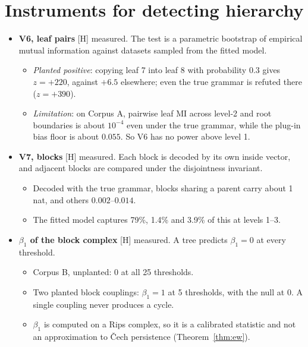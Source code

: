 \documentclass[11pt]{article}
\theoremstyle{definition}
\theoremstyle{remark}
\newcommand{\src}[1]{\textsf{\small[#1]}}
\newcommand{\st}[1]{\textsf{\small\color{gray}#1}}
\begin{document}
\section{Instruments for detecting hierarchy}
\begin{itemize}
  \item \textbf{V6, leaf pairs} \src{H} \st{measured}. The test is a parametric bootstrap of empirical mutual information against datasets sampled from the fitted model.
  \begin{itemize}
    \item \emph{Planted positive}: copying leaf 7 into leaf 8 with probability $0.3$ gives $z=+220$, against $+6.5$ elsewhere; even the true grammar is refuted there ($z=+390$).
    \item \emph{Limitation}: on Corpus A, pairwise leaf MI across level-2 and root boundaries is about $10^{-4}$ even under the true grammar, while the plug-in bias floor is about $0.055$. So V6 has no power above level 1.
  \end{itemize}
  \item \textbf{V7, blocks} \src{H} \st{measured}. Each block is decoded by its own inside vector, and adjacent blocks are compared under the disjointness invariant.
  \begin{itemize}
    \item Decoded with the true grammar, blocks sharing a parent carry about 1 nat, and others $0.002$--$0.014$.
    \item The fitted model captures 79\%, 1.4\% and 3.9\% of this at levels 1--3.
  \end{itemize}
  \item \textbf{$\beta_1$ of the block complex} \src{H} \st{measured}. A tree predicts $\beta_1=0$ at every threshold.
  \begin{itemize}
    \item Corpus B, unplanted: $0$ at all 25 thresholds.
    \item Two planted block couplings: $\beta_1=1$ at 5 thresholds, with the null at $0$. A single coupling never produces a cycle.
    \item $\beta_1$ is computed on a Rips complex, so it is a calibrated statistic and not an approximation to \v{C}ech persistence (Theorem~\ref{thm:ew}).
  \end{itemize}
\end{itemize}
\end{document}
